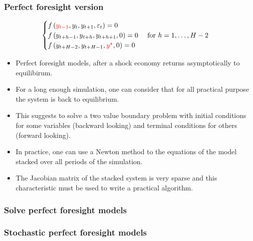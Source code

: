 \documentclass{beamer}
\begin{document}
\begin{frame}
  \frametitle{Perfect foresight version}

  \[
    \begin{cases}
      f\left( {\color{red}y_{t-1}},y_t,y_{t+1},\varepsilon_t \right) = 0\\
      f\left( y_{t+h-1},y_{t+h},y_{t+h+1}, 0 \right) = 0\quad \text{ for }h=1,\ldots,H-2\\
      f\left( y_{t+H-2},y_{t+H-1},{\color{red}y^{\star}}, 0 \right) = 0\\
    \end{cases}
  \]


  \begin{itemize}
  \item Perfect foresight models, after a shock economy returns asymptotically
    to equilibirum.
  \item For a long enough simulation, one can consider that for all
    practical purpose the system is back to equilibrium.
  \item This suggests to solve a two value boundary problem with
    initial conditions for some variables (backward looking) and
    terminal conditions for others (forward looking).
  \item In practice, one can use a Newton method to the equations of
    the model stacked over all periods of the simulation.
  \item The Jacobian matrix of the stacked system is very sparse and
    this characteristic must be used to write a practical algorithm.
  \end{itemize}

\end{frame}


\begin{frame}
  \frametitle{Solve perfect foresight models}
\end{frame}


\begin{frame}
  \frametitle{Stochastic perfect foresight models}
\end{frame}
\end{document}
